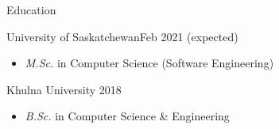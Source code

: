 \documentclass[]{mcdowellcv}
\begin{document}
	\makeheader
	
	
	
	\begin{cvsection}{Education}
		\begin{cvsubsection}{University of Saskatchewan}{}{Feb 2021 (expected)}
			\begin{itemize}
				\item \emph{M.Sc.} in Computer Science (Software Engineering) %
				
			\end{itemize}
		\end{cvsubsection}
		\begin{cvsubsection}{Khulna University}{}{ 2018}
			\begin{itemize}
				\item \emph{B.Sc.} in Computer Science \& Engineering
				
			\end{itemize}
		\end{cvsubsection}
	\end{cvsection}
	
\end{document}
